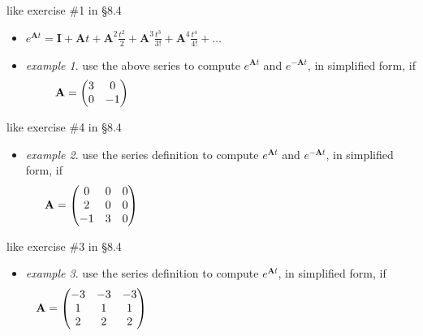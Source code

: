 \documentclass[urlcolor=blue,dvipsnames]{beamer}
\newcommand{\bA}{\mathbf{A}}
\newcommand{\bI}{\mathbf{I}}
\begin{document}
\begin{frame}{like exercise \#1 in \S8.4}

\begin{itemize}
\item $e^{\bA t} = \bI + \bA t + \bA^2 \frac{t^2}{2} + \bA^3 \frac{t^3}{3!} + \bA^4 \frac{t^4}{4!} + \dots$

\medskip
\item \emph{example 1}.  use the above series to compute $e^{\bA t}$ and $e^{-\bA t}$, in simplified form, if
    $$\bA = \begin{pmatrix} 3 & 0 \\ 0 & -1 \end{pmatrix}     \hspace{80mm}$$
\end{itemize}

\vspace{40mm}
\end{frame}


\begin{frame}{like exercise \#4 in \S8.4}

\begin{itemize}
\item \emph{example 2}.  use the series definition to compute $e^{\bA t}$ and $e^{-\bA t}$, in simplified form, if
    $$\bA = \begin{pmatrix} 0 & 0 & 0 \\ 2 & 0 & 0 \\ -1 & 3 & 0 \end{pmatrix}     \hspace{80mm}$$
\end{itemize}

\vspace{40mm}
\end{frame}


\begin{frame}{like exercise \#3 in \S8.4}

\begin{itemize}
\item \emph{example 3}.  use the series definition to compute $e^{\bA t}$, in simplified form, if
    $$\bA = \begin{pmatrix} -3 & -3 & -3 \\ 1 & 1 & 1 \\ 2 & 2 & 2 \end{pmatrix}     \hspace{80mm}$$
\end{itemize}

\vspace{40mm}
\end{frame}
\end{document}
